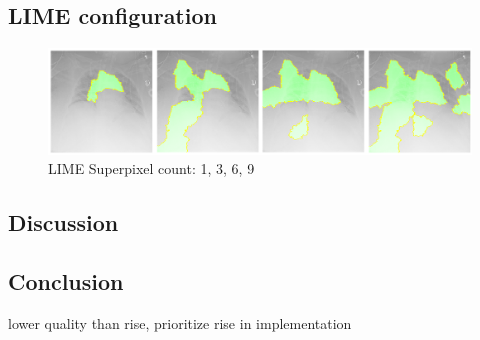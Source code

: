 \subsection{LIME configuration}

\begin{figure}[H]
\centering
\caption{LIME Superpixel count: 1, 3, 6, 9}
\includegraphics[width=14cm]{chapters/03_classification/images/lime-superpixel.png}
\end{figure}

\subsection{Discussion}


\subsection{Conclusion}
lower quality than rise, prioritize rise in implementation